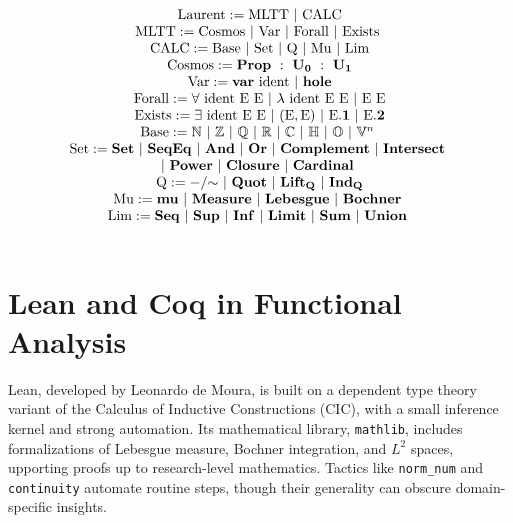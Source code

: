 \documentclass{article}
\begin{document}
$$
\begin{array}{c} \\
   \mathrm{Laurent} := \mathrm{MLTT}\ |\ \mathrm{CALC} \\
   \mathrm{MLTT} := \mathrm{Cosmos}\ |\ \mathrm{Var}\ |\ \mathrm{Forall}\ |\ \mathrm{Exists}\ \\
   \mathrm{CALC} := \mathrm{Base}\ |\ \mathrm{Set}\ |\ \mathrm{Q}\ |\ \mathrm{Mu}\ |\ \mathrm{Lim} \\
   \mathrm{Cosmos} := \mathbf{Prop}\ :\ \mathbf{U_0}\ :\ \mathbf{U_1} \\
   \mathrm{Var} := \mathbf{var}\ \mathrm{ident}\ |\ \mathbf{hole} \\
   \mathrm{Forall} := \forall\ \mathrm{ident}\ \mathrm{E}\ \mathrm{E}\ |\ \lambda\ \mathrm{ident}\ \mathrm{E}\ \mathrm{E}\ |\ \mathrm{E}\ \mathrm{E} \\
   \mathrm{Exists} := \exists\ \mathrm{ident}\ \mathrm{E}\ \mathrm{E}\ |\ (\mathrm{E}, \mathrm{E})\ |\ \mathrm{E}\mathbf{.1}\ |\ \mathrm{E}\mathbf{.2} \\
   \mathrm{Base} := \mathbb{N}\ |\ \mathbb{Z}\ |\ \mathbb{Q}\ |\ \mathbb{R}\ |\ \mathbb{C}\ |\ \mathbb{H}\ |\ \mathbb{O}\ |\ \mathbb{V}^n\ \\
   \mathrm{Set} := \mathbf{Set}\ |\ \mathbf{SeqEq}\ |\ \mathbf{And}\ |\ \mathbf{Or}\ 
                |\ \mathbf{Complement}\ |\ \mathbf{Intersect}\ \\
                |\ \mathbf{Power}\ |\ \mathbf{Closure}\ |\ \mathbf{Cardinal}\ \\
   \mathrm{Q} := \mathbf{-/\hspace{-1mm}\sim}\ |\ \mathbf{Quot}\ |\ \mathbf{Lift_Q}\ |\ \mathbf{Ind_Q} \\
   \mathrm{Mu} := \mathbf{mu}\ |\ \mathbf{Measure}\ 
                |\ \mathbf{Lebesgue}\ |\ \mathbf{Bochner}\ \\
   \mathrm{Lim} := \mathbf{Seq}\ |\ \mathbf{Sup}\ |\ \mathbf{Inf}\ 
               |\ \mathbf{Limit}\ |\ \mathbf{Sum}\ |\ \mathbf{Union}\ \\
         \\
\end{array}
$$

\section{Lean and Coq in Functional Analysis}
Lean, developed by Leonardo de Moura, is built on a dependent type theory variant
of the Calculus of Inductive Constructions (CIC), with a small inference kernel
and strong automation. Its mathematical library, \texttt{mathlib},
includes formalizations of Lebesgue measure, Bochner integration, and $L^2$ spaces,
upporting proofs up to research-level mathematics.
Tactics like \texttt{norm\_num} and \texttt{continuity} automate routine steps,
though their generality can obscure domain-specific insights.
\end{document}
